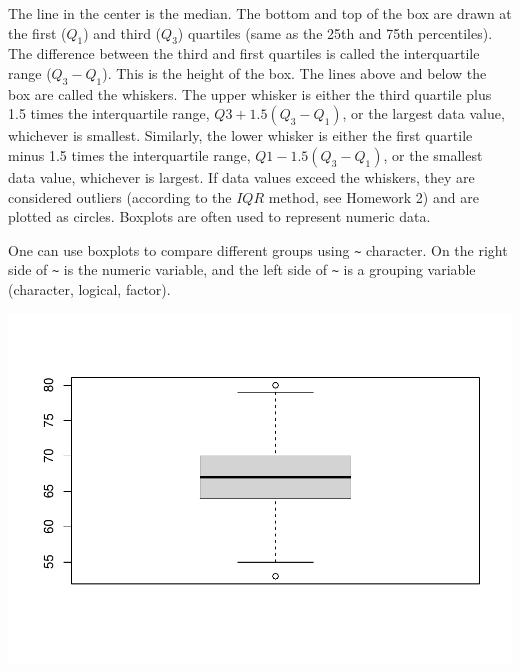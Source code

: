 \documentclass[
]{book}
\newenvironment{Shaded}{\begin{snugshade}}{\end{snugshade}}
\newcommand{\DecValTok}[1]{\textcolor[rgb]{0.00,0.00,0.81}{#1}}
\newcommand{\KeywordTok}[1]{\textcolor[rgb]{0.13,0.29,0.53}{\textbf{#1}}}
\newcommand{\NormalTok}[1]{#1}
\newcommand{\OperatorTok}[1]{\textcolor[rgb]{0.81,0.36,0.00}{\textbf{#1}}}
\newcommand{\StringTok}[1]{\textcolor[rgb]{0.31,0.60,0.02}{#1}}
\begin{document}
The line in the center is the median. The bottom and top of the box are drawn at the first (\(Q_1\)) and third (\(Q_3\)) quartiles (same as the 25th and 75th percentiles). The difference between the third and first quartiles is called the interquartile range (\(Q_3-Q_1\)). This is the height of the box. The lines above and below the box are called the whiskers. The upper whisker is either the third quartile plus 1.5 times the interquartile range, \(Q3 +1.5(Q_3-Q_1)\), or the largest data value, whichever is smallest. Similarly, the lower whisker is either the first quartile minus 1.5 times the interquartile range, \(Q1-1.5(Q_3-Q_1)\), or the smallest data value, whichever is largest. If data values exceed the whiskers, they are considered outliers (according to the \(IQR\) method, see Homework 2) and are plotted as circles. Boxplots are often used to represent numeric data.

One can use boxplots to compare different groups using \texttt{\textasciitilde{}} character. On the right side of \texttt{\textasciitilde{}} is the numeric variable, and the left side of \texttt{\textasciitilde{}} is a grouping variable (character, logical, factor).

\begin{Shaded}
\end{Shaded}

\includegraphics{_main_files/figure-latex/unnamed-chunk-177-1.pdf}
\end{document}
